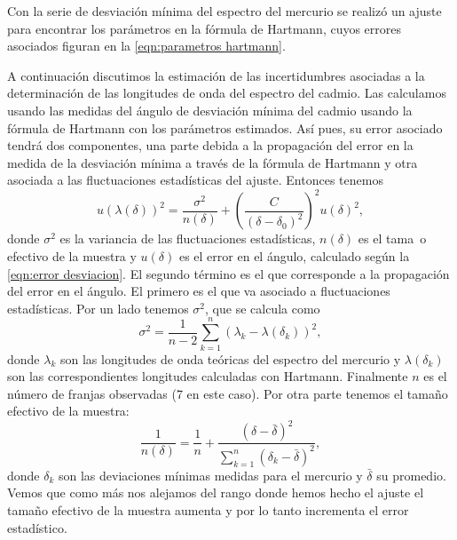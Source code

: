\documentclass[12pt]{article}
\numberwithin{table}{section}
\numberwithin{figure}{section}
\numberwithin{equation}{section}
\begin{document}
Con la serie de desviación mínima del espectro del mercurio se realizó un ajuste para encontrar los parámetros en la fórmula de Hartmann, cuyos errores asociados figuran en la \cref{eqn:parametros hartmann}.

A continuación discutimos la estimación de las incertidumbres asociadas a la determinación de las longitudes de onda del espectro del cadmio. Las calculamos usando las medidas del ángulo de desviación mínima del cadmio usando la fórmula de Hartmann con los parámetros estimados. Así pues, su error asociado tendrá dos componentes, una parte debida a la propagación del error en la medida de la desviación mínima a través de la fórmula de Hartmann y otra asociada a las fluctuaciones estadísticas del ajuste. Entonces tenemos
\begin{equation} \label{eqn:error longitud}
	u(\lambda(\delta))^2 = \frac{\sigma^2}{n(\delta)} + \left(\frac{C}{(\delta - \delta_0)^2}\right)^2 u(\delta)^2,
\end{equation}
donde \( \sigma^2 \) es la variancia de las fluctuaciones estadísticas, \( n(\delta) \) es el tama~o efectivo de la muestra y \( u(\delta) \) es el error en el ángulo, calculado según la \cref{eqn:error desviacion}. El segundo término es el que corresponde a la propagación del error en el ángulo. El primero es el que va asociado a fluctuaciones estadísticas. Por un lado tenemos \( \sigma^2 \), que se calcula como
\begin{equation*}
	\sigma^2 = \frac{1}{n-2} \sum_{k = 1}^{n} (\lambda_k - \lambda(\delta_k))^2,
\end{equation*}
donde \( \lambda_k \) son las longitudes de onda teóricas del espectro del mercurio y \( \lambda(\delta_k) \) son las correspondientes longitudes calculadas con Hartmann. Finalmente \( n \) es el número de franjas observadas (7 en este caso). Por otra parte tenemos el tamaño efectivo de la muestra:
\begin{equation*}
	\frac{1}{n(\delta)} = \frac{1}{n} + \frac{(\delta - \bar{\delta})^2}{\sum_{k = 1}^{n}(\delta_k - \bar{\delta})^2 },
\end{equation*}
donde \( \delta_k \) son las deviaciones mínimas medidas para el mercurio y \( \bar{\delta} \) su promedio. Vemos que como más nos alejamos del rango donde hemos hecho el ajuste el tamaño efectivo de la muestra aumenta y por lo tanto incrementa el error estadístico.
\end{document}
